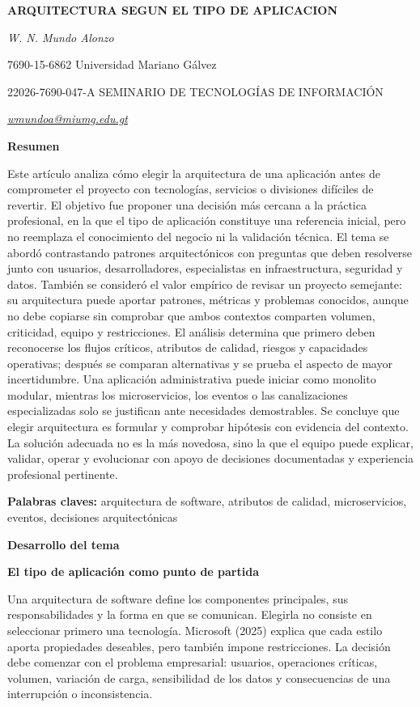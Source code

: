 \documentclass[12pt,letterpaper]{article}
\newcommand{\seccion}[1]{%
  \vspace{4pt}%
  {\noindent\textbf{#1}\par}%
  \vspace{1pt}%
}
\begin{document}
\justifying
\sloppy

\begin{center}
{\bfseries ARQUITECTURA SEGUN EL TIPO DE APLICACION\par}
\vspace{4pt}
{\itshape W. N. Mundo Alonzo\par}
7690-15-6862 Universidad Mariano Gálvez\par
22026-7690-047-A SEMINARIO DE TECNOLOGÍAS DE INFORMACIÓN\par
{\itshape \href{mailto:wmundoa@miumg.edu.gt}{wmundoa@miumg.edu.gt}\par}
\end{center}

\seccion{Resumen}
Este artículo analiza cómo elegir la arquitectura de una aplicación antes de comprometer el proyecto con tecnologías, servicios o divisiones difíciles de revertir. El objetivo fue proponer una decisión más cercana a la práctica profesional, en la que el tipo de aplicación constituye una referencia inicial, pero no reemplaza el conocimiento del negocio ni la validación técnica. El tema se abordó contrastando patrones arquitectónicos con preguntas que deben resolverse junto con usuarios, desarrolladores, especialistas en infraestructura, seguridad y datos. También se consideró el valor empírico de revisar un proyecto semejante: su arquitectura puede aportar patrones, métricas y problemas conocidos, aunque no debe copiarse sin comprobar que ambos contextos comparten volumen, criticidad, equipo y restricciones. El análisis determina que primero deben reconocerse los flujos críticos, atributos de calidad, riesgos y capacidades operativas; después se comparan alternativas y se prueba el aspecto de mayor incertidumbre. Una aplicación administrativa puede iniciar como monolito modular, mientras los microservicios, los eventos o las canalizaciones especializadas solo se justifican ante necesidades demostrables. Se concluye que elegir arquitectura es formular y comprobar hipótesis con evidencia del contexto. La solución adecuada no es la más novedosa, sino la que el equipo puede explicar, validar, operar y evolucionar con apoyo de decisiones documentadas y experiencia profesional pertinente.

\noindent\textbf{Palabras claves:} arquitectura de software, atributos de calidad, microservicios, eventos, decisiones arquitectónicas

\seccion{Desarrollo del tema}

\textbf{El tipo de aplicación como punto de partida}\par
Una arquitectura de software define los componentes principales, sus responsabilidades y la forma en que se comunican. Elegirla no consiste en seleccionar primero una tecnología. Microsoft (2025) explica que cada estilo aporta propiedades deseables, pero también impone restricciones. La decisión debe comenzar con el problema empresarial: usuarios, operaciones críticas, volumen, variación de carga, sensibilidad de los datos y consecuencias de una interrupción o inconsistencia.
\end{document}
